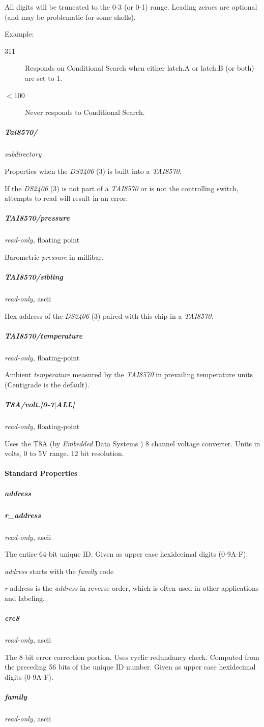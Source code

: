 All digits will be truncated to the 0-3 (or 0-1) range. Leading zeroes
are optional (and may be problematic for some shells). 

Example: \begin{description}
\item [311 ] Responds
on Conditional Search when either latch.A or latch.B (or both) are set to
1. 
\item [$<$100 ] Never responds to Conditional Search. 
\end{description}

\subparagraph*{Tai8570/}\textit{subdirectory} 

Properties when the \textsf{\textit{DS2406} (3)} is built into a \textit{TAI8570.} 

If the \textsf{\textit{DS2406} (3)} is not part of a \textit{TAI8570} or is not the controlling switch,
attempts to read will result in an error. 
\subparagraph*{TAI8570/pressure}\textit{read-only,} floating
point 

Barometric \textit{pressure} in millibar. 
\subparagraph*{TAI8570/sibling}\textit{read-only,} ascii 

Hex address of the \textsf{\textit{DS2406} (3)} paired with this chip in a \textit{TAI8570.} 
\subparagraph*{TAI8570/temperature}\textit{read-only,}
floating-point 

Ambient \textit{temperature} measured by the \textit{TAI8570} in prevailing temperature units
(Centigrade is the default). 
\subparagraph*{T8A/volt.[0-7$|$ALL]}\textit{read-only,} floating-point 

Uses the T8A (by \textit{Embedded} Data Systems ) 8 channel voltage converter. Units
in volts, 0 to 5V range. 12 bit resolution. 
\paragraph*{Standard Properties}
         

\subparagraph*{address}
\subparagraph*{r\_address}\textit{read-only,} ascii 

The entire 64-bit unique ID. Given as upper case hexidecimal digits (0-9A-F).


\textit{address} starts with the \textit{family} code 

\textit{r} address is the \textit{address} in reverse order, which is often used in other
applications and labeling. 
\subparagraph*{crc8}\textit{read-only,} ascii 

The 8-bit error correction portion. Uses cyclic redundancy check. Computed
from the preceding 56 bits of the unique ID number. Given as upper case
hexidecimal digits (0-9A-F). 
\subparagraph*{family}\textit{read-only,} ascii 

